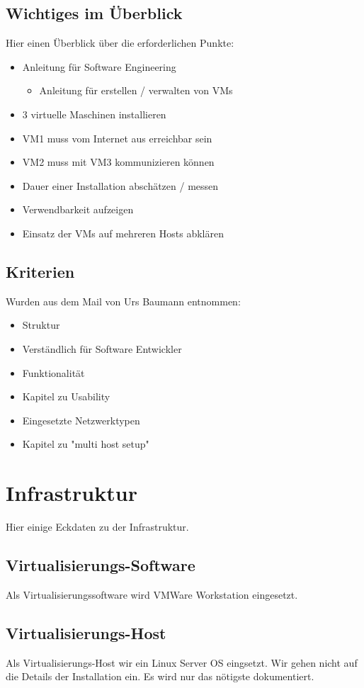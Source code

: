 \documentclass[a4,12pt]{scrartcl}
\begin{document}
\subsection{Wichtiges im Überblick}
Hier einen Überblick über die erforderlichen Punkte:
\begin{itemize}
\item Anleitung für Software Engineering 
\begin{itemize}
\item Anleitung für erstellen / verwalten von VMs
\end{itemize}
\item 3 virtuelle Maschinen installieren
\item VM1 muss vom Internet aus erreichbar sein
\item VM2 muss mit VM3 kommunizieren können
\item Dauer einer Installation abschätzen / messen
\item Verwendbarkeit aufzeigen
\item Einsatz der VMs auf mehreren Hosts abklären
\end{itemize}

\subsection{Kriterien}
Wurden aus dem Mail von Urs Baumann entnommen: 
\begin{itemize}
\item Struktur
\item Verständlich für Software Entwickler
\item Funktionalität 
\item Kapitel zu Usability 
\item Eingesetzte Netzwerktypen 
\item Kapitel zu "multi host setup"  
\end{itemize}
\newpage

\section{Infrastruktur}
Hier einige Eckdaten zu der Infrastruktur. 

\subsection{Virtualisierungs-Software}
Als Virtualisierungssoftware wird VMWare Workstation eingesetzt. 

\subsection{Virtualisierungs-Host}
Als Virtualisierungs-Host wir ein Linux Server OS eingsetzt. Wir gehen nicht auf die Details der Installation ein. Es wird nur das nötigste dokumentiert.  
\end{document}
